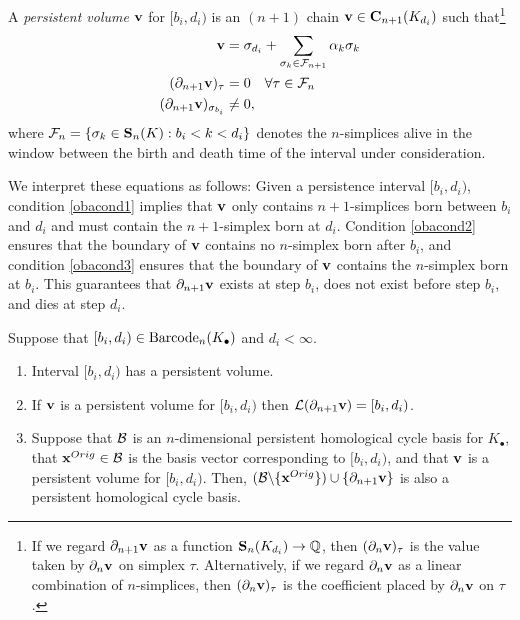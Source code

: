 A \emph{persistent volume} $\mathbf{v}$ for $[b_i, d_i)$ is an $(n+1)$ chain $\mathbf{v} \in \mathbf{C}_{n+1}(K_{d_i})$ such that\footnote{If we regard $\partial_{n+1}\mathbf{v}$ as a function $\mathbf{S}_{n}(K_{d_i}) \to \mathbb{Q}$, then $(\partial_n \mathbf{v})_\tau$ is the value taken by $\partial_n \mathbf{v}$ on simplex $\tau$.  Alternatively, if we regard $\partial_n \mathbf{v}$ as a linear combination of $n$-simplices, then $(\partial_n \mathbf{v})_\tau$ is the coefficient placed by $\partial_n \mathbf{v}$ on $\tau$.}
\begin{align}
    \mathbf{v}   & = \sigma_{d_i} + \sum_{\sigma_k \in \mathcal{F}_{n+1}} \alpha_k\sigma_k \label{obacond1} \\
    (\partial_{n+1} \mathbf{v})_\tau  & = 0 \quad \forall \tau \in \mathcal{F}_n \label{obacond2}\\
    (\partial_{n+1} \mathbf{v})_{\sigma_{b_i}}  & \ne 0, \label{obacond3}
\end{align}
where $\mathcal{F}_n = \{\sigma_k \in \mathbf{S}_n(K) : b_i < k < d_i \}$ denotes the $n$-simplices alive in the window between the birth and death time of the interval under consideration.   

We interpret these equations as follows: Given a persistence interval $[b_i,d_i)$, condition \eqref{obacond1} implies that $\mathbf{v}$ only contains $n+1$-simplices born between $b_i$ and $d_i$ and must contain the $n+1$-simplex born at $d_i$. Condition \eqref{obacond2} ensures that the boundary of $\mathbf{v}$ contains no $n$-simplex born after $b_i$, and condition \eqref{obacond3} ensures that the boundary of $\mathbf{v}$ contains the $n$-simplex born at $b_i$. This guarantees that $\partial_{n+1}\mathbf{v}$ exists at step $b_i$, does not exist before step $b_i$, and dies at step $d_i$.

%
\begin{theorem}  
\label{thm:obayashi}
Suppose that $[b_i, d_i) \in \mathrm{Barcode}_n(K_\bullet)$ and  $d_i < \infty$.
    \begin{enumerate}
        \item Interval $[b_i, d_i)$ has a persistent volume.
        \item If $\mathbf{v}$ is a persistent volume for $[b_i, d_i)$ then $\mathcal{L}(\partial_{n+1}\mathbf{v}) = [b_i, d_i)$.
        \item Suppose that $\mathcal B$ is an $n$-dimensional persistent homological cycle basis for $K_\bullet$, that $\mathbf{x}^{Orig} \in \mathcal B$ is the basis vector corresponding to $[b_i, d_i)$, and that $\mathbf{v}$ is a persistent volume for $[b_i, d_i)$.  Then, $(\mathcal B \backslash \{\mathbf{x}^{Orig}\}) \cup \{\partial_{n+1}\mathbf{v}\} $  
        is also a persistent homological cycle basis.
    \end{enumerate}
\end{theorem}

